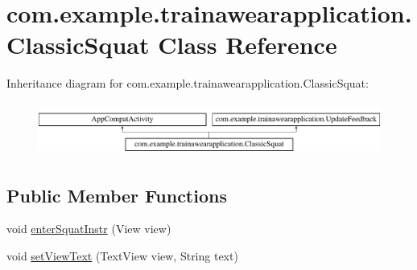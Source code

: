 \hypertarget{classcom_1_1example_1_1trainawearapplication_1_1_classic_squat}{}\section{com.\+example.\+trainawearapplication.\+Classic\+Squat Class Reference}
\label{classcom_1_1example_1_1trainawearapplication_1_1_classic_squat}
Inheritance diagram for com.\+example.\+trainawearapplication.\+Classic\+Squat\+:\begin{figure}[H]
\begin{center}
\leavevmode
\includegraphics[height=1.766562cm]{classcom_1_1example_1_1trainawearapplication_1_1_classic_squat}
\end{center}
\end{figure}
\subsection*{Public Member Functions}
\begin{DoxyCompactItemize}
\item 
void \mbox{\hyperlink{classcom_1_1example_1_1trainawearapplication_1_1_classic_squat_af11bf43a5c57edf97320d8662fc343a1}{enter\+Squat\+Instr}} (View view)
\item 
void \mbox{\hyperlink{classcom_1_1example_1_1trainawearapplication_1_1_classic_squat_ab193e39e2f1255fd88d0508cfe7a63ff}{set\+View\+Text}} (Text\+View view, String text)
\end{DoxyCompactItemize}
